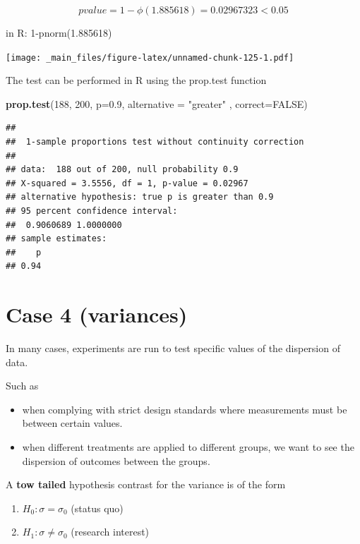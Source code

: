 \documentclass[
]{book}
\newenvironment{Shaded}{\begin{snugshade}}{\end{snugshade}}
\newcommand{\AttributeTok}[1]{\textcolor[rgb]{0.13,0.29,0.53}{#1}}
\newcommand{\ConstantTok}[1]{\textcolor[rgb]{0.56,0.35,0.01}{#1}}
\newcommand{\DecValTok}[1]{\textcolor[rgb]{0.00,0.00,0.81}{#1}}
\newcommand{\FloatTok}[1]{\textcolor[rgb]{0.00,0.00,0.81}{#1}}
\newcommand{\FunctionTok}[1]{\textcolor[rgb]{0.13,0.29,0.53}{\textbf{#1}}}
\newcommand{\NormalTok}[1]{#1}
\newcommand{\StringTok}[1]{\textcolor[rgb]{0.31,0.60,0.02}{#1}}
\providecommand{\tightlist}{%
  \setlength{\itemsep}{0pt}\setlength{\parskip}{0pt}}
\begin{document}
\[pvalue=1-\phi(1.885618)=0.02967323<0.05\]

in R: 1-pnorm(1.885618)

\texttt{[image: \_main\_files/figure-latex/unnamed-chunk-125-1.pdf]}

The test can be performed in R using the prop.test function

\begin{Shaded}
\begin{Highlighting}[]
\FunctionTok{prop.test}\NormalTok{(}\DecValTok{188}\NormalTok{, }\DecValTok{200}\NormalTok{, }\AttributeTok{p=}\FloatTok{0.9}\NormalTok{, }\AttributeTok{alternative =} \StringTok{"greater"}\NormalTok{ , }\AttributeTok{correct=}\ConstantTok{FALSE}\NormalTok{)}
\end{Highlighting}
\end{Shaded}

\begin{verbatim}
## 
##  1-sample proportions test without continuity correction
## 
## data:  188 out of 200, null probability 0.9
## X-squared = 3.5556, df = 1, p-value = 0.02967
## alternative hypothesis: true p is greater than 0.9
## 95 percent confidence interval:
##  0.9060689 1.0000000
## sample estimates:
##    p 
## 0.94
\end{verbatim}

\hypertarget{case-4-variances}{%
\section{Case 4 (variances)}\label{case-4-variances}}

In many cases, experiments are run to test specific values of the dispersion of data.

Such as

\begin{itemize}
\item
  when complying with strict design standards where measurements must be between certain values.
\item
  when different treatments are applied to different groups, we want to see the dispersion of outcomes between the groups.
\end{itemize}

A \textbf{tow tailed} hypothesis contrast for the variance is of the form

\begin{enumerate}
\def\labelenumi{\alph{enumi}.}
\tightlist
\item
  \(H_0:\sigma = \sigma_0\) (status quo)
\item
  \(H_1:\sigma \neq \sigma_0\) (research interest)
\end{enumerate}
\end{document}
